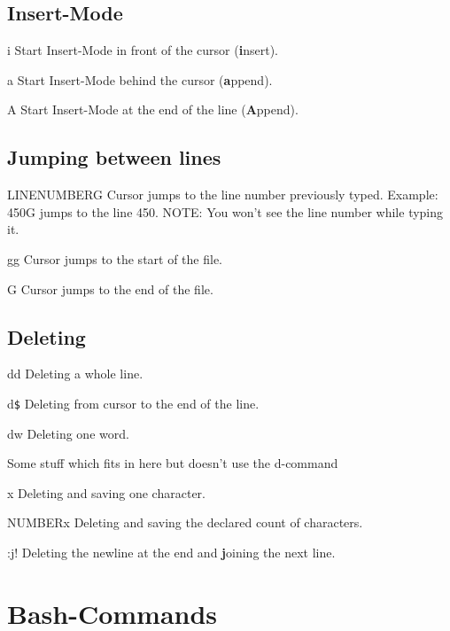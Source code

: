 \documentclass[10pt,a4paper]{scrartcl}
\begin{document}
\subsection{Insert-Mode}
\begin{description}
\item{i} Start Insert-Mode in front of the cursor (\textbf{i}nsert).
\item{a} Start Insert-Mode behind the cursor (\textbf{a}ppend).
\item{A} Start Insert-Mode at the end of the line (\textbf{A}ppend).
\end{description}

\subsection{Jumping between lines}
\begin{description}
\item{LINENUMBERG} Cursor jumps to the line number previously typed. Example: 450G jumps to the line 450. NOTE: You won't see the line number while typing it.
\item{gg} Cursor jumps to the start of the file.
\item{G} Cursor jumps to the end of the file. 
\end{description}

\subsection{Deleting}
\begin{description}
\item{dd} Deleting a whole line.
\item{d\verb&$&} Deleting from cursor to the end of the line.
\item{dw} Deleting one word.
\end{description}

\noindent Some stuff which fits in here but doesn't use the d-command
\begin{description}
\item{x} Deleting and saving one character.
\item{NUMBERx} Deleting and saving the declared count of characters.
\item{:j!} Deleting the newline at the end and \textbf{j}oining the next line.
\end{description}

\section{Bash-Commands}
\end{document}
